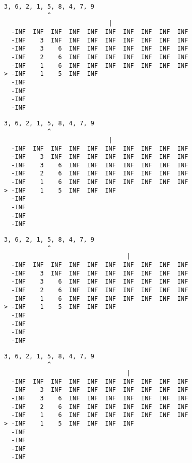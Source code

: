 { \begin{verbatim}
3, 6, 2, 1, 5, 8, 4, 7, 9
            ^
                             |
  -INF  INF  INF  INF  INF  INF  INF  INF  INF  INF
  -INF    3  INF  INF  INF  INF  INF  INF  INF  INF
  -INF    3    6  INF  INF  INF  INF  INF  INF  INF
  -INF    2    6  INF  INF  INF  INF  INF  INF  INF
  -INF    1    6  INF  INF  INF  INF  INF  INF  INF
> -INF    1    5  INF  INF                         
  -INF                                             
  -INF                                             
  -INF                                             
  -INF                                             
\end{verbatim} }

{ \begin{verbatim}
3, 6, 2, 1, 5, 8, 4, 7, 9
            ^
                             |
  -INF  INF  INF  INF  INF  INF  INF  INF  INF  INF
  -INF    3  INF  INF  INF  INF  INF  INF  INF  INF
  -INF    3    6  INF  INF  INF  INF  INF  INF  INF
  -INF    2    6  INF  INF  INF  INF  INF  INF  INF
  -INF    1    6  INF  INF  INF  INF  INF  INF  INF
> -INF    1    5  INF  INF  INF                    
  -INF                                             
  -INF                                             
  -INF                                             
  -INF                                             
\end{verbatim} }

{ \begin{verbatim}
3, 6, 2, 1, 5, 8, 4, 7, 9
            ^
                                  |
  -INF  INF  INF  INF  INF  INF  INF  INF  INF  INF
  -INF    3  INF  INF  INF  INF  INF  INF  INF  INF
  -INF    3    6  INF  INF  INF  INF  INF  INF  INF
  -INF    2    6  INF  INF  INF  INF  INF  INF  INF
  -INF    1    6  INF  INF  INF  INF  INF  INF  INF
> -INF    1    5  INF  INF  INF                    
  -INF                                             
  -INF                                             
  -INF                                             
  -INF                                             
\end{verbatim} }

{ \begin{verbatim}
3, 6, 2, 1, 5, 8, 4, 7, 9
            ^
                                  |
  -INF  INF  INF  INF  INF  INF  INF  INF  INF  INF
  -INF    3  INF  INF  INF  INF  INF  INF  INF  INF
  -INF    3    6  INF  INF  INF  INF  INF  INF  INF
  -INF    2    6  INF  INF  INF  INF  INF  INF  INF
  -INF    1    6  INF  INF  INF  INF  INF  INF  INF
> -INF    1    5  INF  INF  INF  INF               
  -INF                                             
  -INF                                             
  -INF                                             
  -INF                                             
\end{verbatim} }

